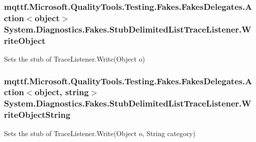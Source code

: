 \hypertarget{class_system_1_1_diagnostics_1_1_fakes_1_1_stub_delimited_list_trace_listener_aa916f8809fef7ada180588c69e5d0b09}{
\subsubsection[{Write\-Object}]{\setlength{\rightskip}{0pt plus 5cm}mqttf.\-Microsoft.\-Quality\-Tools.\-Testing.\-Fakes.\-Fakes\-Delegates.\-Action$<$object$>$ System.\-Diagnostics.\-Fakes.\-Stub\-Delimited\-List\-Trace\-Listener.\-Write\-Object}}\label{class_system_1_1_diagnostics_1_1_fakes_1_1_stub_delimited_list_trace_listener_aa916f8809fef7ada180588c69e5d0b09}


Sets the stub of Trace\-Listener.\-Write(\-Object o)

\hypertarget{class_system_1_1_diagnostics_1_1_fakes_1_1_stub_delimited_list_trace_listener_abea6595775ebd794527b64e0f212a1dc}{
\subsubsection[{Write\-Object\-String}]{\setlength{\rightskip}{0pt plus 5cm}mqttf.\-Microsoft.\-Quality\-Tools.\-Testing.\-Fakes.\-Fakes\-Delegates.\-Action$<$object, string$>$ System.\-Diagnostics.\-Fakes.\-Stub\-Delimited\-List\-Trace\-Listener.\-Write\-Object\-String}}\label{class_system_1_1_diagnostics_1_1_fakes_1_1_stub_delimited_list_trace_listener_abea6595775ebd794527b64e0f212a1dc}


Sets the stub of Trace\-Listener.\-Write(\-Object o, String category)

